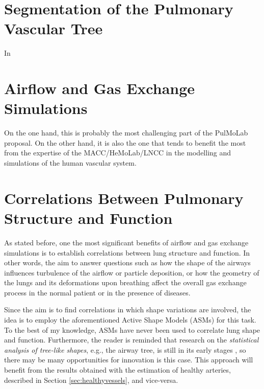 \section{Segmentation of the Pulmonary Vascular Tree}

\challenge

In \citep{Dongen,Ebrahimdoost,Gutierrez,Linguraru,Shikata,Wala}

\approach


\section{Airflow and Gas Exchange Simulations}

\challenge

On the one hand, this is probably the most challenging part of the PulMoLab proposal. On the other hand, it is also the one that tends to benefit the most from the expertise of the MACC/HeMoLab/LNCC in the modelling and simulations of the human vascular system. 

\approach

\section{Correlations Between Pulmonary Structure and Function}

\challenge

As stated before, one the most significant benefits of airflow and gas exchange simulations is to establish correlations between lung structure and function. In other words, the aim to answer questions such as how the shape of the airways influences turbulence of the airflow or particle deposition, or how the geometry of the lungs and its deformations upon breathing affect the overall gas exchange process in the normal patient or in the presence of diseases. 

\approach

Since the aim is to find correlations in which shape variations are involved, the idea is to employ the aforementioned Active Shape Models (ASMs) \citep{Cootes} for this task. To the best of my knowledge, ASMs have never been used to correlate lung shape and function. Furthermore, the reader is reminded that research on the {\em statistical analysis of tree-like shapes}, e.g., the airway tree, is still in its early stages \citep{Feragen2011,Feragen2012}, so there may be many opportunities for innovation is this case. This approach will benefit from the results obtained with the estimation of healthy arteries, described in Section \ref{sec:healthyvessels}, and vice-versa.

